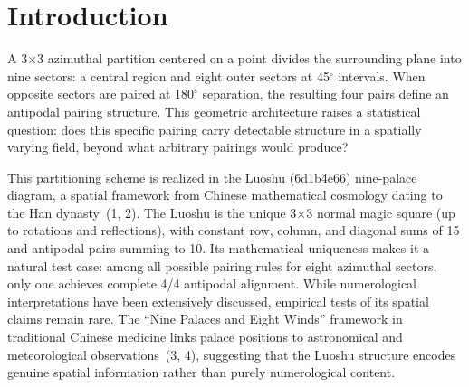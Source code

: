 \documentclass[9pt,twocolumn]{article}
\begin{document}
\vspace{6pt}

\noindent{}

\vspace{10pt}

\section*{Introduction}

A 3$\times$3 azimuthal partition centered on a point divides the surrounding plane into nine sectors: a central region and eight outer sectors at 45$^\circ$ intervals. When opposite sectors are paired at 180$^\circ$ separation, the resulting four pairs define an antipodal pairing structure. This geometric architecture raises a statistical question: does this specific pairing carry detectable structure in a spatially varying field, beyond what arbitrary pairings would produce?

This partitioning scheme is realized in the Luoshu (\u6d1b\u4e66) nine-palace diagram, a spatial framework from Chinese mathematical cosmology dating to the Han dynasty~(1, 2). The Luoshu is the unique 3$\times$3 normal magic square (up to rotations and reflections), with constant row, column, and diagonal sums of 15 and antipodal pairs summing to 10. Its mathematical uniqueness makes it a natural test case: among all possible pairing rules for eight azimuthal sectors, only one achieves complete 4/4 antipodal alignment. While numerological interpretations have been extensively discussed, empirical tests of its spatial claims remain rare. The ``Nine Palaces and Eight Winds'' framework in traditional Chinese medicine links palace positions to astronomical and meteorological observations~(3, 4), suggesting that the Luoshu structure encodes genuine spatial information rather than purely numerological content.
\end{document}
